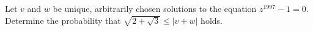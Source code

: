 Let $v$ and $w$ be unique, arbitrarily chosen solutions to the equation $z^{1997}-1=0$.
Determine the probability that $\sqrt{2+\sqrt{3}}\leq |v+w|$ holds.